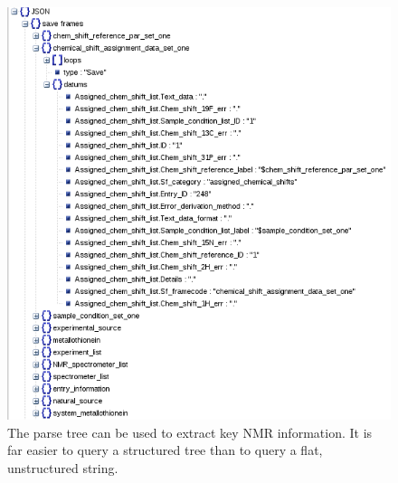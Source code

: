 \begin{figure}
  \includegraphics[scale=0.5]{figures/nmrpystar_structure}
  \caption[The parse tree can be used to extract key NMR information]
          {The parse tree can be used to extract key NMR information.
           It is far easier to query a structured tree than to query
           a flat, unstructured string.}
  \label{nmrpystar_structure}
\end{figure}

